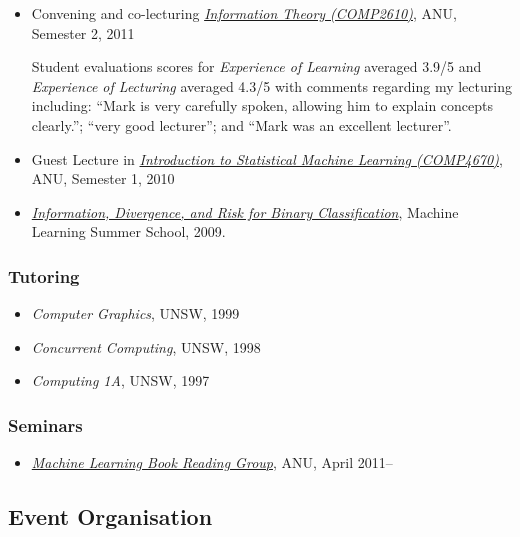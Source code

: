 \documentclass{article}
\begin{document}
\begin{itemize}%
\item Convening and co-lecturing \emph{\href{http://cs.anu.edu.au/courses/COMP2610/}{Information Theory (COMP2610)}}, ANU, Semester 2, 2011

Student evaluations scores for \emph{Experience of Learning} averaged 3.9/5 and \emph{Experience of Lecturing} averaged 4.3/5 with comments regarding my lecturing including: ``{}Mark is very carefully spoken, allowing him to explain concepts clearly.''{}; ``{}very good lecturer''{}; and ``{}Mark was an excellent lecturer''{}.


\item Guest Lecture in \emph{\href{http://sml.nicta.com.au/isml10.html}{Introduction to Statistical Machine Learning (COMP4670)}}, ANU, Semester 1, 2010


\item \emph{\href{http://mark.reid.name/iem/mlss-2009-lecture.html}{Information, Divergence, and Risk for Binary Classification}}, Machine Learning Summer School, 2009.



\end{itemize}
\hypertarget{tutoring}{}\subsubsection*{{Tutoring}}\label{tutoring}

\begin{itemize}%
\item \emph{Computer Graphics}, UNSW, 1999
\item \emph{Concurrent Computing}, UNSW, 1998
\item \emph{Computing 1A}, UNSW, 1997

\end{itemize}
\hypertarget{seminars}{}\subsubsection*{{Seminars}}\label{seminars}

\begin{itemize}%
\item \emph{\href{http://mark.reid.name/work/reading-group.html}{Machine Learning Book Reading Group}}, ANU, April 2011--{}

\end{itemize}
\hypertarget{event_organisation}{}\subsection*{{Event Organisation}}\label{event_organisation}
\end{document}
